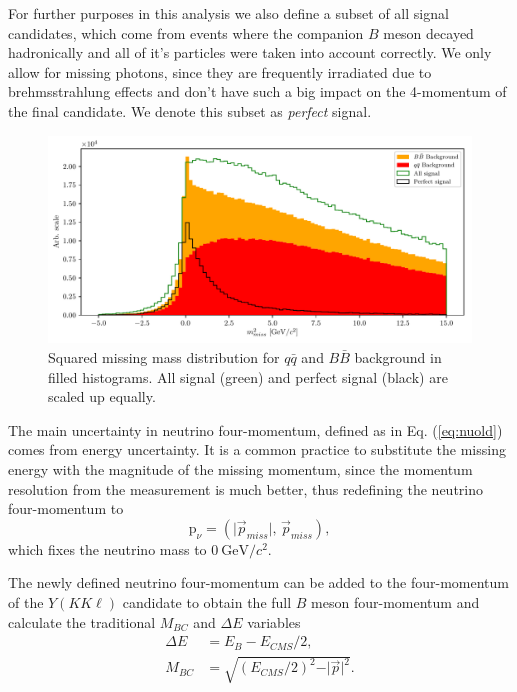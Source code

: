 \documentclass[oneside,a4paper,openany,12pt]{scrbook}
\newcommand {\e}[1]{\mathrm{~#1}}
\begin{document}
For further purposes in this analysis we also define a subset of all signal candidates, which come from events where the companion $B$ meson decayed hadronically and all of it's particles were taken into account correctly. We only allow for missing photons, since they are frequently irradiated due to brehmsstrahlung effects and don't have such a big impact on the 4-momentum of the final candidate. We denote this subset as \textit{perfect} signal.

\begin{figure}[H]
\centering
\captionsetup{width=.8\linewidth}
\includegraphics[width=\linewidth]{fig/missM2}
\caption{Squared missing mass distribution for $q \bar q$ and $B \bar B$ background in filled histograms. All signal (green) and perfect signal (black) are scaled up equally.}
\label{fig:missm2}
\end{figure}

The main uncertainty in neutrino four-momentum, defined as in Eq. (\ref{eq:nuold}) comes from energy uncertainty. It is a common practice to substitute the missing energy with the magnitude of the missing momentum, since the momentum resolution from the measurement is much better, thus redefining the neutrino four-momentum to
\begin{equation}
\label{eq:nunew}
\mathrm{p}_\nu = \left(\vert \vec{p}_{miss} \vert,\,\vec{p}_{miss} \right),
\end{equation}
which fixes the neutrino mass to $0\e{GeV}/c^2$.

The newly defined neutrino four-momentum can be added to the four-momentum of the $Y(KK\ell)$ candidate to obtain the full $B$ meson four-momentum and calculate the traditional $M_{BC}$ and $\Delta E$ variables
\begin{align}
\label{eq:de}
\Delta E &= E_B - E_{CMS}/2,\\
M_{BC} &= \sqrt{\left(E_{CMS}/2\right)^2 - \vert \vec{p} \vert^2}.
\end{align}
\end{document}
